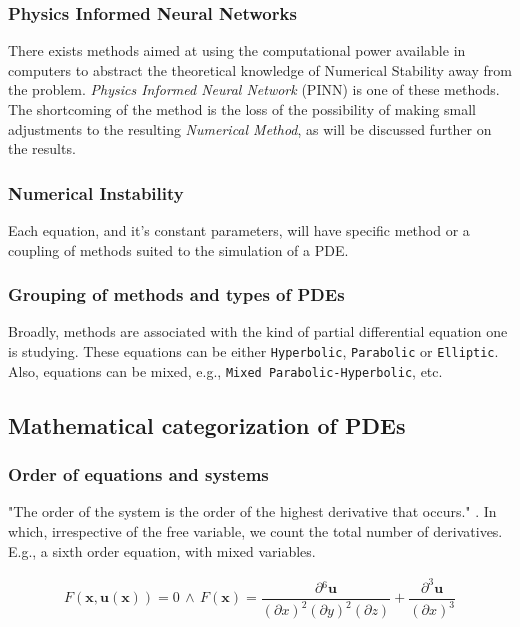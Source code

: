 \documentclass[11pt]{article}
\begin{document}
\subsubsection{Physics Informed Neural Networks}
\label{sec:org558bf63}
There exists methods aimed at using the computational power available in computers
to abstract the theoretical knowledge of Numerical Stability away from
the problem. \emph{Physics Informed Neural Network}
(PINN) is one of these methods. The shortcoming of the method is the loss of the
possibility of making small adjustments to the resulting \emph{Numerical
Method}, as will be discussed further on the results.

\subsubsection{Numerical Instability}
\label{sec:org0e0474f}
Each equation, and it's constant parameters, will have specific method
or a coupling of methods suited to the simulation of a PDE.

\subsubsection{Grouping of methods and types of PDEs}
\label{sec:org109f829}
Broadly, methods are associated with the kind of partial differential
equation one is studying. These equations can be either \texttt{Hyperbolic},
\texttt{Parabolic} or \texttt{Elliptic}. Also, equations can be mixed, e.g., \texttt{Mixed
Parabolic-Hyperbolic}, etc.

\subsection{Mathematical categorization of PDEs}
\label{sec:org26f9439}
\subsubsection{Order of equations and systems}
\label{sec:orgeaabdf4}
"The order of the system is the order of the highest derivative that occurs."
\cite{john1978partial}. In which, irrespective of the free variable, we count the
total number of derivatives. E.g., a sixth order equation, with mixed variables.

\begin{equation}
\label{eq:sixth-order}
\begin{aligned}
F(\mathbf{x},\mathbf{u(x)}) = 0 \, \land \,
F(\mathbf{x}) = \dfrac{\partial{}^6 \mathbf{u}}{(\partial{x})^2(\partial{y})^2(\partial{z})} + \dfrac{\partial^3{} \mathbf{u}}{(\partial{x})^3}
\end{aligned}
\end{equation}
\end{document}
